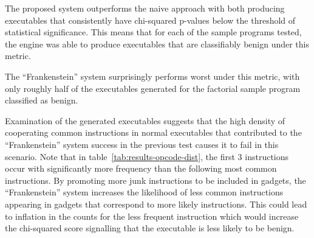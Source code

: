     The proposed system outperforms the naive approach with both producing
    executables that consistently have chi-squared p-values below the threshold
    of statistical significance. This means that for each of the sample
    programs tested, the engine was able to produce executables that are
    classifiably benign under this metric.

    The ``Frankenstein'' system surprisingly performs worst under this metric,
    with only roughly half of the executables generated for the factorial sample
    program classified as benign.

    Examination of the generated executables suggests that the high density of
    cooperating common instructions in normal executables that contributed to
    the ``Frankenstein'' system success in the previous test causes it to fail
    in this scenario. Note that in table~\ref{tab:results-opcode-dist}, the
    first 3 instructions occur with significantly more frequency than the
    following most common instructions. By promoting more junk instructions to
    be included in gadgets, the ``Frankenstein'' system increases the likelihood
    of less common instructions appearing in gadgets that correspond to more
    likely instructions. This could lead to inflation in the counts for the less
    frequent instruction which would increase the chi-squared score signalling
    that the executable is less likely to be benign.


